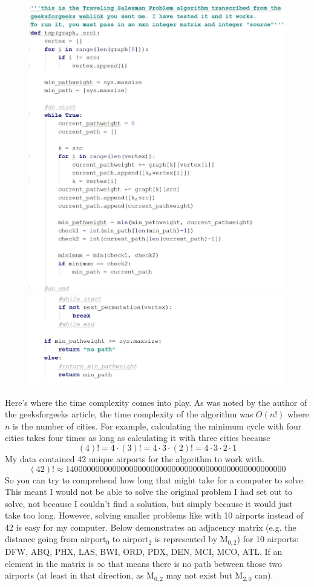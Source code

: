 \documentclass[12pt]{article}
\begin{document}
\begin{figure}[h]
       \includegraphics[scale=.85]{code1}
       \includegraphics[scale=.85]{code2}
       \centering
\end{figure}

Here's where the time complexity comes into play. As was noted by the author
of the geeksforgeeks article, the time complexity of the algorithm was \(O(n!)\)
where $n$ is the number of cities. For example, calculating the minimum cycle with
four cities takes four times as long as calculating it with three cities because
\[(4)! = 4 \cdot (3)! = 4 \cdot 3 \cdot (2)! = 4 \cdot 3 \cdot 2 \cdot 1\]
My data contained 42 unique airports for the algorithm to work with. 
\[(42)! \approx 1400000000000000000000000000000000000000000000000000\] So you
can try to comprehend how long that might take for a computer to solve. This
meant I would not be able to solve the original problem I had set out to solve,
not because I couldn't find a solution, but simply because it would just take
too long. However, solving smaller problems like with 10 airports instead of 42
is easy for my computer. Below demonstrates an adjacency matrix (e.g. the distance
going from airport$_0$ to airport$_2$ is represented by M$_{0,2}$) for 10 airports: 
DFW, ABQ, PHX, LAS, BWI, ORD, PDX, DEN, MCI, MCO, ATL. If an element in the matrix
is $\infty$ that means there is no path between those two airports (at least
in that direction, as M$_{0,2}$ may not exist but M$_{2,0}$ can).
\end{document}
